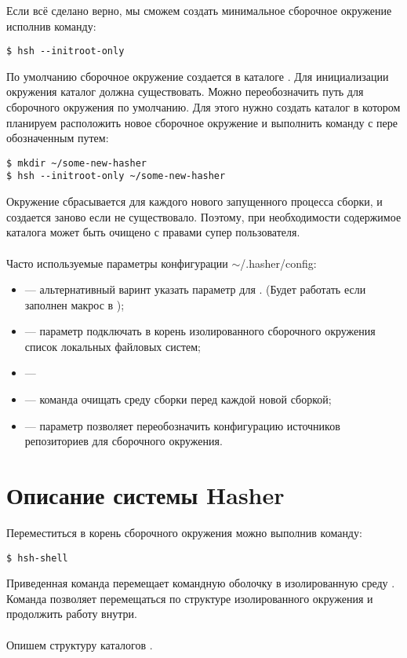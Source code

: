 Если всё сделано верно, мы сможем создать минимальное сборочное окружение исполнив команду:
\begin{verbatim}
$ hsh --initroot-only
\end{verbatim}
По умолчанию сборочное окружение создается в каталоге . Для инициализации окружения
каталог должна существовать. Можно переобозначить путь для сборочного окружения по умолчанию.
Для этого нужно создать каталог в котором планируем расположить новое сборочное окружение и выполнить
команду с пере обозначенным путем:
\begin{verbatim}
$ mkdir ~/some-new-hasher
$ hsh --initroot-only ~/some-new-hasher
\end{verbatim}
Окружение сбрасывается для каждого нового запущенного процесса сборки, и создается заново если
не существовало. Поэтому, при необходимости содержимое каталога может быть очищено с правами
супер пользователя.\\
\\
Часто используемые параметры конфигурации $\sim$/.hasher/config:
\begin{itemize}
	\item {} --- альтернативный варинт указать параметр  для .
	(Будет работать если заполнен макрос   в );
	\item {} --- параметр подключать в корень изолированного сборочного
	окружения список локальных файловых систем;
	\item {} ---
	\item {} --- команда очищать среду сборки перед каждой новой сборкой;
	\item {} --- параметр позволяет переобозначить конфигурацию источников
	репозиториев для сборочного окружения.
\end{itemize}

\section{Описание системы Hasher}
Переместиться в корень сборочного окружения можно выполнив команду:
\begin{verbatim}
$ hsh-shell
\end{verbatim}
Приведенная команда перемещает командную оболочку в изолированную среду .
Команда позволяет перемещаться по структуре изолированного окружения и продолжить работу
внутри.\\
\\
Опишем структуру каталогов .

